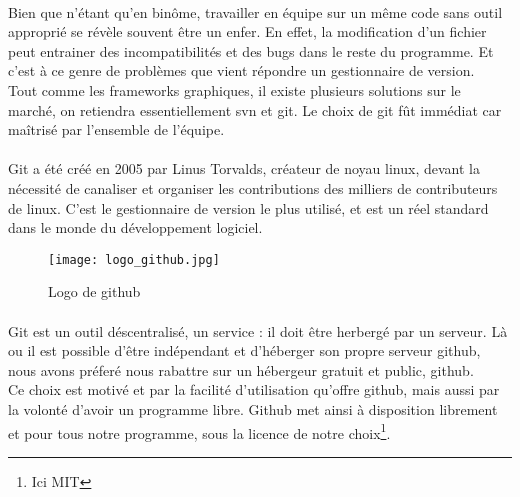         \paragraph{}
            Bien que n'étant qu'en binôme, travailler en équipe sur un même code sans outil approprié se révèle souvent être un enfer. En effet, la modification d'un fichier peut entrainer des incompatibilités et des bugs dans le reste du programme. Et c'est à ce genre de problèmes que vient répondre un gestionnaire de version.
            \\ Tout comme les frameworks graphiques, il existe plusieurs solutions sur le marché, on retiendra essentiellement svn et git. Le choix de git fût immédiat car maîtrisé par l'ensemble de l'équipe. 

        \paragraph{}
            Git a été créé en 2005 par Linus Torvalds, créateur de noyau linux, devant la nécessité de canaliser et organiser les contributions des milliers de contributeurs de linux. C'est le gestionnaire de version le plus utilisé, et est un réel standard dans le monde du développement logiciel.

        \begin{figure}[h]
            \begin{center}
                \texttt{[image: logo\_github.jpg]}
            \end{center}

            \caption{Logo de github}
            \label{github}
        \end{figure}

        \paragraph{}
            Git est un outil déscentralisé, un service : il doit être herbergé par un serveur. Là ou il est possible d'être indépendant et d'héberger son propre serveur github, nous avons préferé nous rabattre sur un hébergeur gratuit et public, github.
            \\ Ce choix est motivé et par la facilité d'utilisation qu'offre github, mais aussi par la volonté d'avoir un programme libre. Github met ainsi à 
            disposition librement et pour tous notre programme, sous la licence de notre choix\footnote{Ici MIT}.
            


